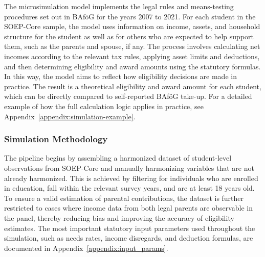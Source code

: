 

The microsimulation model implements the legal rules and means-testing procedures set out in BAföG \citep{bafoeg_law} for the years 2007 to 2021. 
For each student in the SOEP-Core sample, the model uses information on income, assets, and household structure for the student as well as for others who are expected to help support them, such as the parents and spouse, if any. 
The process involves calculating net incomes according to the relevant tax rules, applying asset limits and deductions, and then determining eligibility and award amounts using the statutory formulas. 
In this way, the model aims to reflect how eligibility decisions are made in practice. The result is a theoretical eligibility and award amount for each student, which can be directly compared to self-reported BAföG take-up.
For a detailed example of how the full calculation logic applies in practice, see Appendix~\ref{appendix:simulation-example}.



\subsubsection{Simulation Methodology}
The pipeline begins by assembling a harmonized dataset of student-level observations from SOEP-Core and manually harmonizing variables that are not already harmonized. 
This is achieved by filtering for individuals who are enrolled in education, fall within the relevant survey years, and are at least 18 years old. 
To ensure a valid estimation of parental contributions, the dataset is further restricted to cases where income data from both legal parents are observable in the panel, thereby reducing bias and improving the accuracy of eligibility estimates. 
The most important statutory input parameters used throughout the simulation, such as needs rates, income disregards, and deduction formulas, are documented in Appendix~\ref{appendix:input_params}.

